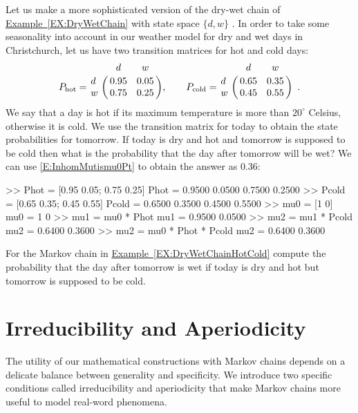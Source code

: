 {\begin{example}\label{EX:DryWetChainHotCold}
Let us make a more sophisticated version of the dry-wet chain of \hyperref[EX:DryWetChain]{Example~\ref*{EX:DryWetChain}} with state space $\{d,w\}$ .  In order to take some seasonality into account in our weather model for dry and wet days in Christchurch, let us have two transition matrices for hot and cold days:
\[
P_{\text{hot}} = 
\bordermatrix{~ & d & w \cr
d & 0.95 & 0.05 \cr
w & 0.75 & 0.25},
\qquad
P_{\text{cold}} = 
\bordermatrix{~ & d & w \cr
d & 0.65 & 0.35 \cr
w & 0.45 & 0.55} \enspace .
\]
We say that a day is hot if its  maximum temperature is more than $20^{\circ}$ Celsius, otherwise it is cold.  We use the transition matrix for today to obtain the state probabilities for tomorrow.  If today is dry and hot and tomorrow is supposed to be cold then what is the probability that the day after tomorrow will be wet?  We can use \eqref{E:InhomMutismu0Pt} to obtain the answer as $0.36$: 
\begin{VrbM}
>> Phot = [0.95 0.05; 0.75 0.25] %
Phot =
    0.9500    0.0500
    0.7500    0.2500
>> Pcold = [0.65 0.35; 0.45 0.55] %
Pcold =
    0.6500    0.3500
    0.4500    0.5500
>> mu0 = [1 0] %
mu0 =     1     0
>> mu1 = mu0 * Phot %
mu1 =    0.9500    0.0500
>> mu2 = mu1 * Pcold %
mu2 =    0.6400    0.3600
>> mu2 = mu0 * Phot * Pcold %
mu2 =    0.6400    0.3600
\end{VrbM}
\end{example}

\begin{exercise}\label{Exr:DryWetChainHotCold}
For the Markov chain in \hyperref[EX:DryWetChainHotCold]{Example~\ref*{EX:DryWetChainHotCold}}  compute the probability that the day after tomorrow is wet if today is dry and hot but tomorrow is supposed to be cold.
\end{exercise}

\section{Irreducibility and Aperiodicity}\label{S:IrredAperiod}
The utility of our mathematical constructions with Markov chains depends on a delicate balance between generality and specificity.  We introduce two specific conditions called irreducibility and aperiodicity that make Markov chains more useful to model real-word phenomena.


}
